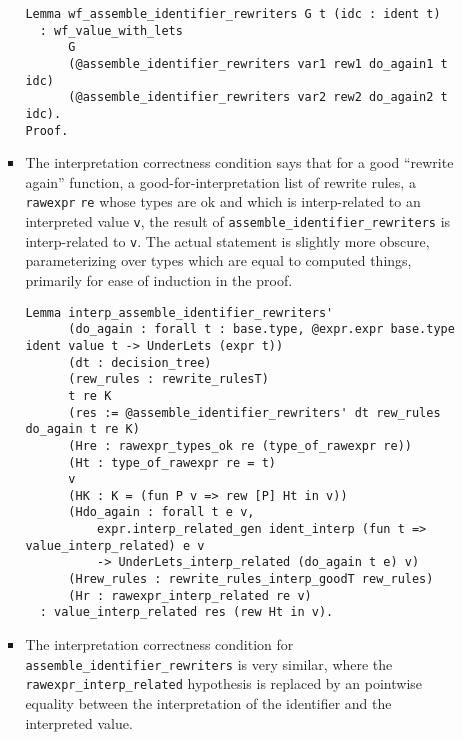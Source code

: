 \begin{itemize}
\begin{itemize}
\begin{itemize}
\begin{verbatim}
Lemma wf_assemble_identifier_rewriters G t (idc : ident t)
  : wf_value_with_lets
      G
      (@assemble_identifier_rewriters var1 rew1 do_again1 t idc)
      (@assemble_identifier_rewriters var2 rew2 do_again2 t idc).
Proof.
\end{verbatim}
    \item
      The interpretation correctness condition says that for a good
      ``rewrite again'' function, a good-for-interpretation list of
      rewrite rules, a \texttt{rawexpr} \texttt{re} whose types are ok
      and which is interp-related to an interpreted value \texttt{v},
      the result of
      \texttt{assemble\_identifier\_rewriters\textquotesingle{}} is
      interp-related to \texttt{v}. The actual statement is slightly
      more obscure, parameterizing over types which are equal to
      computed things, primarily for ease of induction in the proof.

\begin{verbatim}
Lemma interp_assemble_identifier_rewriters'
      (do_again : forall t : base.type, @expr.expr base.type ident value t -> UnderLets (expr t))
      (dt : decision_tree)
      (rew_rules : rewrite_rulesT)
      t re K
      (res := @assemble_identifier_rewriters' dt rew_rules do_again t re K)
      (Hre : rawexpr_types_ok re (type_of_rawexpr re))
      (Ht : type_of_rawexpr re = t)
      v
      (HK : K = (fun P v => rew [P] Ht in v))
      (Hdo_again : forall t e v,
          expr.interp_related_gen ident_interp (fun t => value_interp_related) e v
          -> UnderLets_interp_related (do_again t e) v)
      (Hrew_rules : rewrite_rules_interp_goodT rew_rules)
      (Hr : rawexpr_interp_related re v)
  : value_interp_related res (rew Ht in v).
\end{verbatim}
    \item
      The interpretation correctness condition for
      \texttt{assemble\_identifier\_rewriters} is very similar, where
      the \texttt{rawexpr\_interp\_related} hypothesis is replaced by an
      pointwise equality between the interpretation of the identifier
      and the interpreted value.


\end{itemize}
\end{itemize}
\end{itemize}
